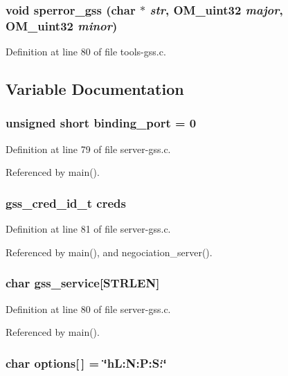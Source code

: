 \subsubsection{\setlength{\rightskip}{0pt plus 5cm}void sperror\_\-gss (char $\ast$ {\em str}, OM\_\-uint32 {\em major}, OM\_\-uint32 {\em minor})}\label{server-gss_8c_a32}




Definition at line 80 of file tools-gss.c.

\subsection{Variable Documentation}
\subsubsection{\setlength{\rightskip}{0pt plus 5cm}unsigned short {\bf binding\_\-port} = 0}\label{server-gss_8c_a27}




Definition at line 79 of file server-gss.c.

Referenced by main().
\subsubsection{\setlength{\rightskip}{0pt plus 5cm}gss\_\-cred\_\-id\_\-t {\bf creds}}\label{server-gss_8c_a29}




Definition at line 81 of file server-gss.c.

Referenced by main(), and negociation\_\-server().
\subsubsection{\setlength{\rightskip}{0pt plus 5cm}char {\bf gss\_\-service}[STRLEN]}\label{server-gss_8c_a28}




Definition at line 80 of file server-gss.c.

Referenced by main().
\subsubsection{\setlength{\rightskip}{0pt plus 5cm}char {\bf options}[$\,$] = \char`\"{}h\-L:N:P:S:\char`\"{}}\label{server-gss_8c_a24}




